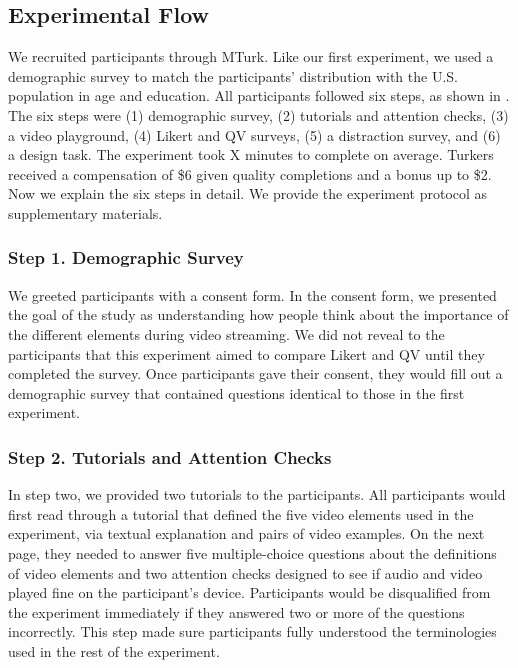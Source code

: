 \subsection{Experimental Flow}
We recruited participants through MTurk. Like our first experiment, we used a demographic survey to match the participants' distribution with the U.S. population in age and education. All participants followed six steps, as shown in . The six steps were (1) demographic survey, (2) tutorials and attention checks, (3) a video playground, (4) Likert and QV surveys, (5) a distraction survey, and (6) a design task. The experiment took X minutes to complete on average. Turkers received a compensation of \$6 given quality completions and a bonus up to \$2. Now we explain the six steps in detail. We provide the experiment protocol as supplementary materials.

\subsubsection{Step 1. Demographic Survey}
We greeted participants with a consent form. In the consent form, we presented the goal of the study as understanding how people think about the importance of the different elements during video streaming. We did not reveal to the participants that this experiment aimed to compare Likert and QV until they completed the survey. Once participants gave their consent, they would fill out a demographic survey that contained questions identical to those in the first experiment.

\subsubsection{Step 2. Tutorials and Attention Checks}
In step two, we provided two tutorials to the participants. All participants would first read through a tutorial that defined the five video elements used in the experiment, via textual explanation and pairs of video examples. On the next page, they needed to answer five multiple-choice questions about the definitions of video elements and two attention checks designed to see if audio and video played fine on the participant's device. Participants would be disqualified from the experiment immediately if they answered two or more of the questions incorrectly. This step made sure participants fully understood the terminologies used in the rest of the experiment.

